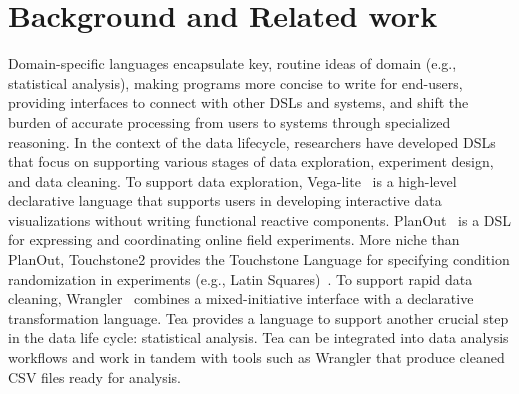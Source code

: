 \section{Background and Related work} \label{sec:relatedWorkTea}
Domain-specific languages encapsulate key, routine ideas of domain (e.g.,
statistical analysis), making programs more concise to write for end-users,
providing interfaces to connect with other DSLs and systems, and shift the
burden of accurate processing from users to systems through specialized
reasoning. In the context of the data lifecycle, researchers have developed DSLs
that focus on supporting various stages of data exploration, experiment design,
and data cleaning. To support data exploration,
Vega-lite~\cite{satyanarayan2017vega} is a high-level declarative language that
supports users in developing interactive data visualizations without writing
functional reactive components. PlanOut~\cite{bakshy2014planout} is a DSL for
expressing and coordinating online field experiments. More niche than PlanOut,
Touchstone2 provides the Touchstone Language for specifying condition
randomization in experiments (e.g., Latin
Squares)~\cite{eiselmayer2019touchstone2}.%
To support rapid data cleaning,  Wrangler~\cite{kandel2011wrangler} combines a
mixed-initiative interface with a declarative transformation language. Tea
provides a language to support another crucial step in the data life cycle:
statistical analysis. Tea can be integrated into data analysis workflows and
work in tandem with tools such as Wrangler that produce cleaned CSV files ready
for analysis.

